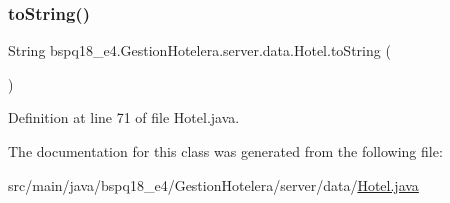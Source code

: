 \subsubsection{\texorpdfstring{to\+String()}{toString()}}
{\footnotesize\ttfamily String bspq18\+\_\+e4.\+Gestion\+Hotelera.\+server.\+data.\+Hotel.\+to\+String (\begin{DoxyParamCaption}{ }\end{DoxyParamCaption})}



Definition at line 71 of file Hotel.\+java.



The documentation for this class was generated from the following file\+:\begin{DoxyCompactItemize}
\item 
src/main/java/bspq18\+\_\+e4/\+Gestion\+Hotelera/server/data/\mbox{\hyperlink{_hotel_8java}{Hotel.\+java}}\end{DoxyCompactItemize}
